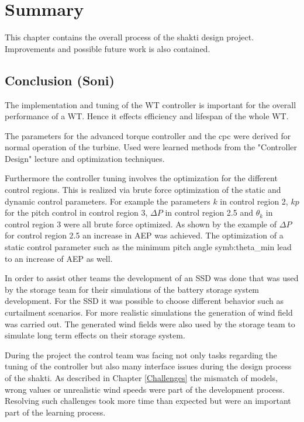 \chapter{Summary}
This chapter contains the overall process of the \gls{shakti} design project.
Improvements and possible future work is also contained.
\section{Conclusion (Soni)}
The implementation and tuning of the \gls{WT} controller is important for the overall performance of a \gls{WT}. 
Hence it effects efficiency and lifespan of the whole \gls{WT}.

The parameters for the advanced torque controller and the \gls{cpc} were derived for normal operation of the turbine. Used were learned methods from the "Controller Design" lecture and optimization techniques.

Furthermore the controller tuning involves the optimization for the different control regions.
This is realized via brute force optimization of the static and dynamic control parameters.
For example the parameters $k$ in control region 2, $kp$ for the pitch control in control region 3, $\Delta P$ in  control region 2.5 and $\theta_k$ in control region 3 were all brute force optimized.
As shown by the example of $\Delta P$ for control region 2.5 an increase in \gls{AEP} was achieved.
The optimization of a static control parameter such as the minimum pitch angle \gls{symb:theta_min} lead to an increase of \gls{AEP} as well.

In order to assist other teams the development of an \gls{SSD} was done that was used by the storage team for their simulations of the battery storage system development.
For the \gls{SSD} it was possible to choose different behavior such as curtailment scenarios.
For more realistic simulations the generation of wind field was carried out. The generated wind fields were also used by the storage team to simulate long term effects on their storage system.

During the project the control team was facing not only tasks regarding the tuning of the controller but also many interface issues during the design process of the \gls{shakti}.
As described in Chapter \ref{Challenges} the mismatch of models, wrong values or unrealistic wind speeds were part of the development process. 
Resolving such challenges took more time than expected but were an important part of the learning process. 

